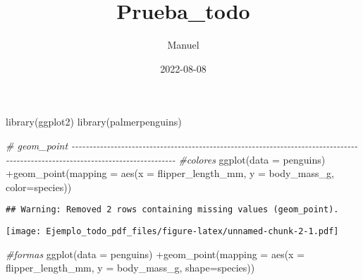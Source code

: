 \documentclass[
]{article}
\title{Prueba\_todo}
\author{Manuel}
\date{2022-08-08}
\newenvironment{Shaded}{\begin{snugshade}}{\end{snugshade}}
\newcommand{\AttributeTok}[1]{\textcolor[rgb]{0.77,0.63,0.00}{#1}}
\newcommand{\CommentTok}[1]{\textcolor[rgb]{0.56,0.35,0.01}{\textit{#1}}}
\newcommand{\FunctionTok}[1]{\textcolor[rgb]{0.00,0.00,0.00}{#1}}
\newcommand{\NormalTok}[1]{#1}
\newcommand{\SpecialCharTok}[1]{\textcolor[rgb]{0.00,0.00,0.00}{#1}}
\begin{document}
\maketitle

\begin{Shaded}
\begin{Highlighting}[]
\FunctionTok{library}\NormalTok{(ggplot2)}
\FunctionTok{library}\NormalTok{(palmerpenguins)}
\end{Highlighting}
\end{Shaded}

\begin{Shaded}
\begin{Highlighting}[]
\CommentTok{\#  geom\_point  {-}{-}{-}{-}{-}{-}{-}{-}{-}{-}{-}{-}{-}{-}{-}{-}{-}{-}{-}{-}{-}{-}{-}{-}{-}{-}{-}{-}{-}{-}{-}{-}{-}{-}{-}{-}{-}{-}{-}{-}{-}{-}{-}{-}{-}{-}{-}{-}{-}{-}{-}{-}{-}{-}{-}{-}{-}{-}{-}{-}{-}{-}{-}{-}{-}{-}{-}{-}{-}{-}{-}{-}{-}{-}{-}{-}{-}{-}{-}{-}{-}{-}{-}{-}{-}{-}{-}{-}{-}{-}{-}{-}{-}{-}{-}{-}{-}{-}{-}{-}{-}{-}{-}{-}{-}{-}{-}{-}{-}{-}{-}{-}{-}{-}{-}{-}{-}{-}{-}{-}{-}{-}{-}{-}{-}{-}{-}{-}{-}}
\CommentTok{\#colores}
\FunctionTok{ggplot}\NormalTok{(}\AttributeTok{data =}\NormalTok{ penguins) }\SpecialCharTok{+}\FunctionTok{geom\_point}\NormalTok{(}\AttributeTok{mapping =} \FunctionTok{aes}\NormalTok{(}\AttributeTok{x =}\NormalTok{ flipper\_length\_mm, }\AttributeTok{y =}
\NormalTok{                                                    body\_mass\_g, }\AttributeTok{color=}\NormalTok{species))}
\end{Highlighting}
\end{Shaded}

\begin{verbatim}
## Warning: Removed 2 rows containing missing values (geom_point).
\end{verbatim}

\texttt{[image: Ejemplo\_todo\_pdf\_files/figure-latex/unnamed-chunk-2-1.pdf]}

\begin{Shaded}
\begin{Highlighting}[]
\CommentTok{\#formas}
\FunctionTok{ggplot}\NormalTok{(}\AttributeTok{data =}\NormalTok{ penguins) }\SpecialCharTok{+}\FunctionTok{geom\_point}\NormalTok{(}\AttributeTok{mapping =} \FunctionTok{aes}\NormalTok{(}\AttributeTok{x =}\NormalTok{ flipper\_length\_mm, }\AttributeTok{y =}
\NormalTok{                                                    body\_mass\_g, }\AttributeTok{shape=}\NormalTok{species))}
\end{Highlighting}
\end{Shaded}
\end{document}
